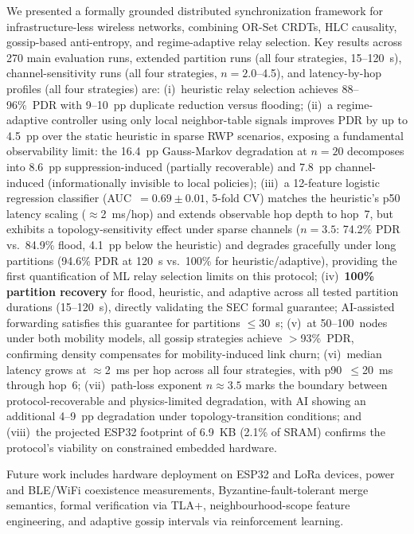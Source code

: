 \documentclass[conference]{IEEEtran}
\begin{document}
We presented a formally grounded distributed synchronization framework for
infrastructure-less wireless networks, combining OR-Set CRDTs, HLC causality,
gossip-based anti-entropy, and regime-adaptive relay selection.  Key results
across 270 main evaluation runs, extended partition runs (all four strategies, 15--120~s),
channel-sensitivity runs (all four strategies, $n=2.0$--4.5), and latency-by-hop
profiles (all four strategies) are:
(i)~heuristic relay selection achieves 88--96\%~PDR with 9--10~pp duplicate reduction
versus flooding; (ii)~a regime-adaptive controller using only local neighbor-table
signals improves PDR by up to 4.5~pp over the static heuristic in sparse RWP scenarios,
exposing a fundamental observability limit: the 16.4~pp Gauss-Markov degradation
at $n=20$ decomposes into 8.6~pp suppression-induced (partially recoverable) and 7.8~pp
channel-induced (informationally invisible to local policies); (iii)~a 12-feature
logistic regression classifier (AUC~$=0.69\pm0.01$, 5-fold CV) matches the
heuristic's p50 latency scaling ($\approx$2~ms/hop) and extends observable hop depth
to hop~7, but exhibits a topology-sensitivity effect under sparse channels ($n=3.5$:
74.2\% PDR vs.\ 84.9\% flood, 4.1~pp below the heuristic) and degrades gracefully
under long partitions (94.6\% PDR at 120~s vs.\ 100\% for heuristic/adaptive),
providing the first quantification of ML relay selection limits on this protocol;
(iv)~\textbf{100\% partition recovery} for flood, heuristic, and adaptive across all
tested partition durations (15--120~s), directly validating the SEC formal guarantee;
AI-assisted forwarding satisfies this guarantee for partitions $\leq$30~s;
(v)~at 50--100~nodes under both mobility models, all gossip strategies achieve
$>$93\%~PDR, confirming density compensates for mobility-induced link churn;
(vi)~median latency grows at $\approx$2~ms per hop across all four strategies,
with p90~$\leq$20~ms through hop~6; (vii)~path-loss exponent $n\approx3.5$
marks the boundary between protocol-recoverable and physics-limited degradation,
with AI showing an additional 4--9~pp degradation under topology-transition conditions;
and (viii)~the projected ESP32 footprint of 6.9~KB (2.1\% of SRAM) confirms the
protocol's viability on constrained embedded hardware.

Future work includes hardware deployment on ESP32 and LoRa devices,
power and BLE/WiFi coexistence measurements, Byzantine-fault-tolerant merge
semantics, formal verification via TLA+, neighbourhood-scope feature engineering,
and adaptive gossip intervals via reinforcement learning.



\end{document}
